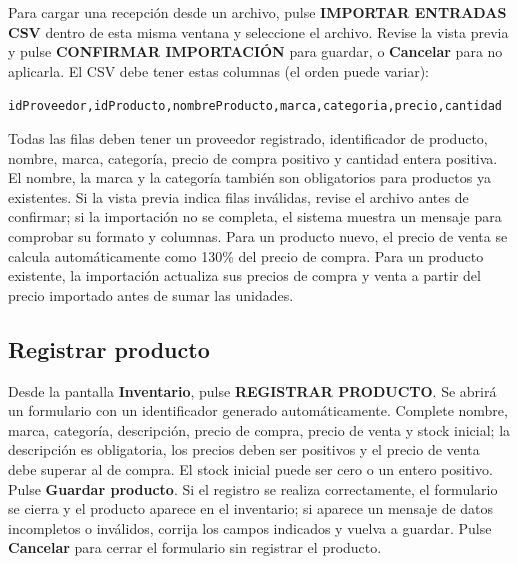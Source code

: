 \documentclass[12pt,a4paper]{article}
\begin{document}
Para cargar una recepción desde un archivo, pulse \textbf{IMPORTAR ENTRADAS CSV} dentro de esta misma ventana y seleccione el archivo. Revise la vista previa y pulse \textbf{CONFIRMAR IMPORTACIÓN} para guardar, o \textbf{Cancelar} para no aplicarla. El CSV debe tener estas columnas (el orden puede variar):
\begin{center}\texttt{idProveedor,idProducto,nombreProducto,marca,categoria,precio,cantidad}\end{center}
Todas las filas deben tener un proveedor registrado, identificador de producto, nombre, marca, categoría, precio de compra positivo y cantidad entera positiva. El nombre, la marca y la categoría también son obligatorios para productos ya existentes. Si la vista previa indica filas inválidas, revise el archivo antes de confirmar; si la importación no se completa, el sistema muestra un mensaje para comprobar su formato y columnas. Para un producto nuevo, el precio de venta se calcula automáticamente como 130\% del precio de compra. Para un producto existente, la importación actualiza sus precios de compra y venta a partir del precio importado antes de sumar las unidades.

\subsection{Registrar producto}
Desde la pantalla \textbf{Inventario}, pulse \textbf{REGISTRAR PRODUCTO}. Se abrirá un formulario con un identificador generado automáticamente. Complete nombre, marca, categoría, descripción, precio de compra, precio de venta y stock inicial; la descripción es obligatoria, los precios deben ser positivos y el precio de venta debe superar al de compra. El stock inicial puede ser cero o un entero positivo. Pulse \textbf{Guardar producto}. Si el registro se realiza correctamente, el formulario se cierra y el producto aparece en el inventario; si aparece un mensaje de datos incompletos o inválidos, corrija los campos indicados y vuelva a guardar. Pulse \textbf{Cancelar} para cerrar el formulario sin registrar el producto.
\end{document}
